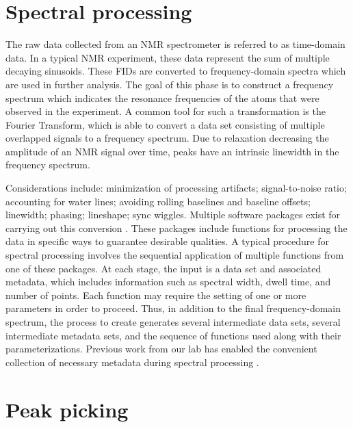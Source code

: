 \section{Spectral processing}

The raw data collected from an NMR spectrometer is referred to as 
time-domain data.  In a typical NMR experiment, these data represent the 
sum of multiple decaying sinusoids.  These FIDs are converted to 
frequency-domain spectra which are used in further analysis.  The goal of 
this phase is to construct a frequency spectrum which indicates the resonance 
frequencies of the atoms that were observed in the experiment.  A common tool 
for such a transformation is the Fourier Transform, which is able to convert 
a data set consisting of multiple overlapped signals to a frequency spectrum.  
Due to relaxation decreasing the amplitude of an NMR signal over time, peaks 
have an intrinsic linewidth in the frequency spectrum.

Considerations include:  minimization of processing artifacts; signal-to-noise 
ratio; accounting for water lines; avoiding rolling baselines and baseline 
offsets; linewidth; phasing; lineshape; sync wiggles.  Multiple software 
packages exist for carrying out this conversion \cite{nmrpipe, rnmrtk}.
These packages include functions for processing the data in specific ways to 
guarantee desirable qualities.  A typical procedure for spectral processing 
involves the sequential application of multiple functions from one of these 
packages.  At each stage, the input is a data set and associated metadata, 
which includes information such as spectral width, dwell time, and number of 
points.  Each function may require the setting of one or more parameters in 
order to proceed.  Thus, in addition to the final frequency-domain spectrum, 
the process to create generates several intermediate data sets, several 
intermediate metadata sets, and the sequence of functions used along with 
their parameterizations.  Previous work from our lab has enabled the 
convenient collection of necessary metadata during spectral 
processing \cite{connjur-wb}.


\section{Peak picking}

